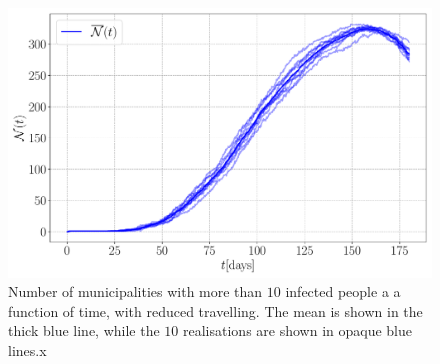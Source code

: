 \begin{figure}[h!]
	\centering
	\includegraphics[width=0.9\columnwidth]{../fig/2Ec_N.pdf}
	\caption{Number of municipalities with more than $10$ infected people a a function of time, with reduced travelling.  The mean is shown in the thick blue line, while the $10$ realisations are shown in opaque blue lines.x}
	\label{fig:infected_Ec}
\end{figure}